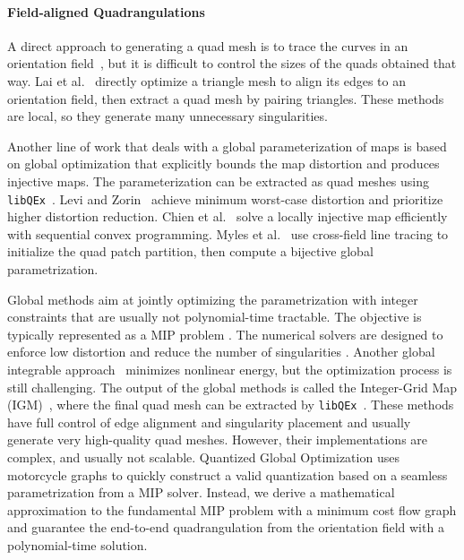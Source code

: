 \paragraph*{Field-aligned Quadrangulations}
A direct approach to generating a quad mesh is to trace the curves in an orientation field~\cite{alliez2003anisotropic}, but it is difficult to control the sizes of the quads obtained that way. Lai et al.~\cite{lai2008incremental} directly optimize a triangle mesh to align its edges to an orientation field, then extract a quad mesh by pairing triangles. These methods are local, so they generate many unnecessary singularities.

Another line of work that deals with a global parameterization of maps is based on global optimization that explicitly bounds the map distortion and produces injective maps. The parameterization can be extracted as quad meshes using \texttt{libQEx}~\cite{ebke2013qex}. Levi and Zorin~\cite{levi2014strict} achieve minimum worst-case distortion and prioritize higher distortion reduction. Chien et al.~\cite{chien2016bounded} solve a locally injective map efficiently with sequential convex programming. Myles et al.~\cite{myles2014robust} use cross-field line tracing to initialize the quad patch partition, then compute a bijective global parametrization.

Global methods aim at jointly optimizing the parametrization with integer constraints that are usually not polynomial-time tractable. The objective is typically represented as a MIP problem \cite{bommes2009mixed}. The numerical solvers are designed to enforce low distortion and reduce the number of singularities \cite{bommes2013integer,myles2013controlled,levi2014strict,myles2014robust}. Another global integrable approach~\cite{diamanti2015integrable} minimizes nonlinear energy, but the optimization process is still challenging. The output of the global methods is called the Integer-Grid Map (IGM)~\cite{bommes2013integer}, where the final quad mesh can be extracted by \texttt{libQEx}~\cite{ebke2013qex}. These methods have full control of edge alignment and singularity placement and usually generate very high-quality quad meshes. However, their implementations are complex, and usually not scalable. Quantized Global Optimization \cite{Campen2015QGP} uses motorcycle graphs to quickly construct a valid quantization based on a seamless parametrization from a MIP solver. Instead, we derive a mathematical approximation to the fundamental MIP problem with a minimum cost flow graph and guarantee the end-to-end quadrangulation from the orientation field with a polynomial-time solution.

